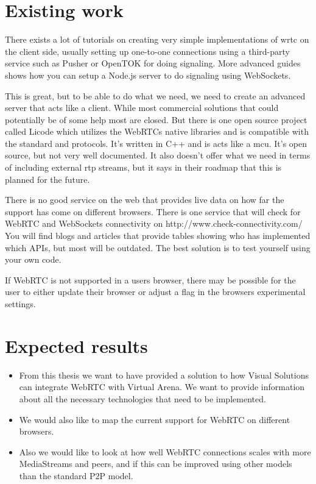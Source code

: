\section{Existing work}
There exists a lot of tutorials on creating very simple implementations of \gls{wrtc} on the client side, usually setting up one-to-one connections using a third-party service such as Pusher or OpenTOK for doing signaling. More advanced guides shows how you can setup a Node.js server to do signaling using WebSockets.

This is great, but to be able to do what we need, we need to create an advanced server that acts like a client. While most commercial solutions that could potentially be of some help most are closed. But there is one open source project called Licode which utilizes the WebRTCs native libraries and is compatible with the standard and protocols. It's written in C++ and is acts like a \gls{mcu}. It's open source, but not very well documented. It also doesn't offer what we need in terms of including external \gls{rtp} streams, but it says in their roadmap that this is planned for the future.

There is no good service on the web that provides live data on how far the support has come on different browsers. There is one service that will check for WebRTC and WebSockets connectivity on http://www.check-connectivity.com/
You will find blogs and articles that provide tables showing who has implemented which APIs, but most will be outdated. The best solution is to test yourself using your own code.

If WebRTC is not supported in a users browser, there may be possible for the user to either update their browser or adjust a flag in the browsers experimental settings.

\section{Expected results}

\begin{itemize}
    \item From this thesis we want to have provided a solution to how Visual Solutions can integrate WebRTC with Virtual Arena. We want to provide information about all the necessary technologies that need to be implemented.
    \item We would also like to map the current support for WebRTC on different browsers.
    \item Also we would like to look at how well WebRTC connections scales with more MediaStreams and peers, and if this can be improved using other models than the standard P2P model.
\end{itemize}
